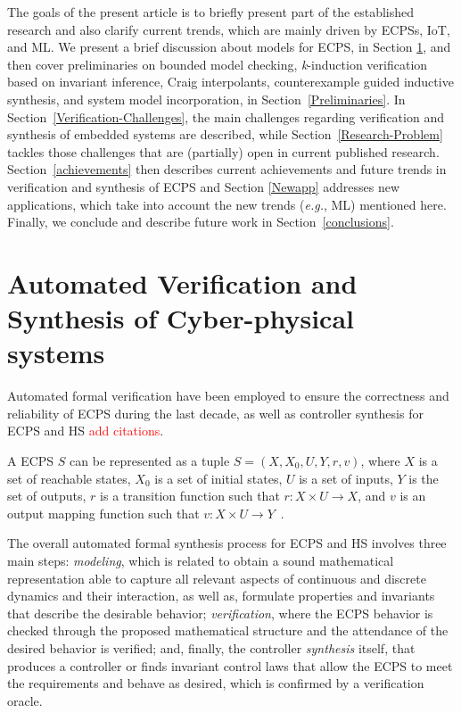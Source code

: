 \documentclass[format=acmsmall, review=false, screen=true]{acmart}
\begin{document}
The goals of the present article is to briefly present part of the established research and also clarify current trends, which are mainly driven by ECPSs, IoT, and ML. We present a brief discussion about models for ECPS, in Section \ref{sec:model}, and then cover preliminaries on bounded model checking, \textit{k}-induction verification based on invariant inference, Craig interpolants, counterexample guided inductive synthesis, and system model incorporation, in Section~\ref{Preliminaries}. In Section~\ref{Verification-Challenges}, the main challenges regarding verification and synthesis of embedded systems are described, while Section~\ref{Research-Problem} tackles those challenges that are (partially) open in current published research. Section~\ref{achievements} then describes current achievements and future trends in verification and synthesis of ECPS and Section \ref{Newapp} addresses new applications, which take into account the new trends ({\it e.g.}, ML) mentioned here. Finally, we conclude and describe future work in Section~\ref{conclusions}.

\section{Automated Verification and Synthesis of Cyber-physical systems}
\label{sec:model}

Automated formal verification have been employed to ensure the correctness and reliability of ECPS during the last decade, as well as controller synthesis for ECPS and HS \textcolor{red}{add citations}. 

A ECPS $S$ can be represented as a tuple $S=(X,X_{0},U,Y,r,v)$, where $X$ is a set of reachable states, $X_{0}$ is a set of initial states, $U$ is a set of inputs, $Y$ is the set of outputs, $r$ is a transition function such that $r:X\times U \rightarrow X$, and  $v$ is an output mapping function such that $v:X\times U \rightarrow Y$~\cite{Rungger16,Alur00,Girard11}.

The overall automated formal synthesis process for ECPS and HS involves three main steps: \textit{modeling}, which is related to obtain a sound mathematical representation able to capture all relevant aspects of continuous and discrete dynamics and their interaction, as well as, formulate properties and invariants that describe the desirable behavior; \textit{verification}, where the ECPS behavior is checked through the proposed mathematical structure and the attendance of the desired behavior is verified; and, finally, the controller \textit{synthesis} itself, that produces a controller or finds invariant control laws that allow the ECPS to meet the requirements and behave as desired, which is confirmed by a verification oracle. 
\end{document}
